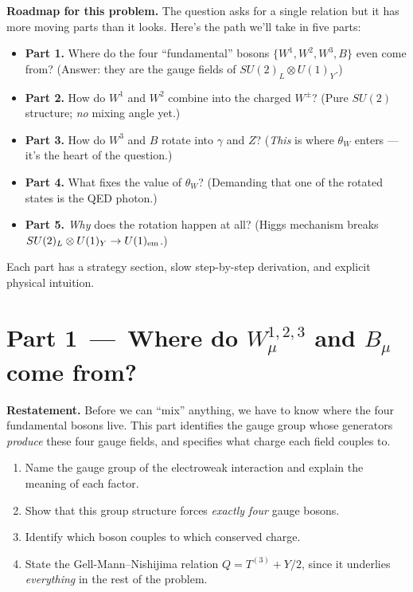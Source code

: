 \documentclass[11pt]{article}
\begin{document}
\begin{intuitionbox}
\textbf{Roadmap for this problem.} The question asks for a single relation but it has more
moving parts than it looks. Here's the path we'll take in five parts:
\begin{itemize}[leftmargin=*]
  \item \textbf{Part 1.} Where do the four ``fundamental'' bosons $\{W^1, W^2, W^3, B\}$ even
        come from? (Answer: they are the gauge fields of $SU(2)_L \otimes U(1)_Y$.)
  \item \textbf{Part 2.} How do $W^1$ and $W^2$ combine into the charged $W^\pm$? (Pure
        $SU(2)$ structure; \emph{no} mixing angle yet.)
  \item \textbf{Part 3.} How do $W^3$ and $B$ rotate into $\gamma$ and $Z$? (\emph{This}
        is where $\theta_W$ enters --- it's the heart of the question.)
  \item \textbf{Part 4.} What fixes the value of $\theta_W$? (Demanding that one of the
        rotated states is the QED photon.)
  \item \textbf{Part 5.} \emph{Why} does the rotation happen at all? (Higgs mechanism breaks
        $SU(2)_L \otimes U(1)_Y \to U(1)_{\rm em}$.)
\end{itemize}
Each part has a strategy section, slow step-by-step derivation, and explicit physical
intuition.
\end{intuitionbox}

\newpage

\section*{Part 1 \,---\, Where do $W^{1,2,3}_\mu$ and $B_\mu$ come from?}

\begin{problembox}
\textbf{Restatement.} Before we can ``mix'' anything, we have to know where the four
fundamental bosons live. This part identifies the gauge group whose generators \emph{produce}
these four gauge fields, and specifies what charge each field couples to.
\end{problembox}

\begin{deliverbox}
\begin{enumerate}[leftmargin=*]
  \item Name the gauge group of the electroweak interaction and explain the meaning of
        each factor.
  \item Show that this group structure forces \emph{exactly four} gauge bosons.
  \item Identify which boson couples to which conserved charge.
  \item State the Gell-Mann--Nishijima relation $Q = T^{(3)} + Y/2$, since it underlies
        \emph{everything} in the rest of the problem.
\end{enumerate}
\end{deliverbox}
\end{document}
